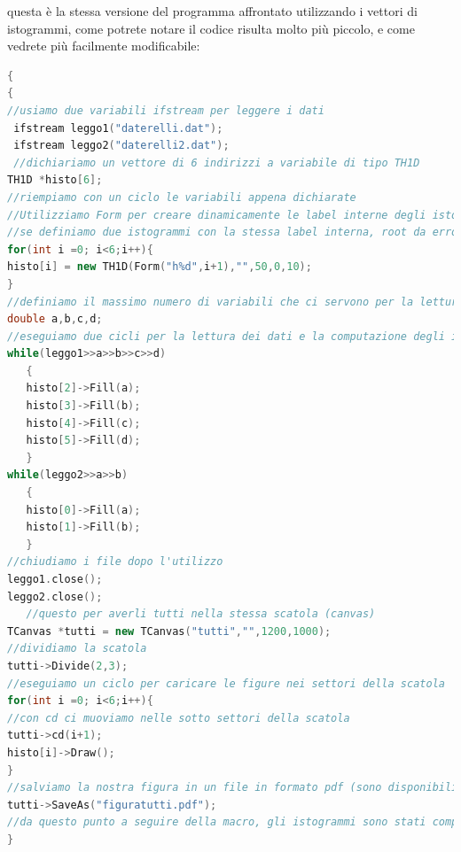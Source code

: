 \documentclass[11pt,fleqn]{book} %
\begin{document}
questa è la stessa versione del programma affrontato utilizzando i vettori di istogrammi, come potrete notare il codice risulta molto più piccolo, e come vedrete più facilmente modificabile:

\begin{lstlisting}[language=c++]
{
{
//usiamo due variabili ifstream per leggere i dati
 ifstream leggo1("daterelli.dat");
 ifstream leggo2("daterelli2.dat");
 //dichiariamo un vettore di 6 indirizzi a variabile di tipo TH1D
TH1D *histo[6];
//riempiamo con un ciclo le variabili appena dichiarate
//Utilizziamo Form per creare dinamicamente le label interne degli istogrammi
//se definiamo due istogrammi con la stessa label interna, root da errore!!!
for(int i =0; i<6;i++){
histo[i] = new TH1D(Form("h%d",i+1),"",50,0,10);
}
//definiamo il massimo numero di variabili che ci servono per la lettura
double a,b,c,d;
//eseguiamo due cicli per la lettura dei dati e la computazione degli istogrammi
while(leggo1>>a>>b>>c>>d)
   {
   histo[2]->Fill(a);
   histo[3]->Fill(b);
   histo[4]->Fill(c);
   histo[5]->Fill(d);
   }
while(leggo2>>a>>b)
   {
   histo[0]->Fill(a);
   histo[1]->Fill(b);
   }
//chiudiamo i file dopo l'utilizzo
leggo1.close();
leggo2.close();
   //questo per averli tutti nella stessa scatola (canvas)
TCanvas *tutti = new TCanvas("tutti","",1200,1000);
//dividiamo la scatola
tutti->Divide(2,3);
//eseguiamo un ciclo per caricare le figure nei settori della scatola
for(int i =0; i<6;i++){
//con cd ci muoviamo nelle sotto settori della scatola
tutti->cd(i+1);
histo[i]->Draw();
}
//salviamo la nostra figura in un file in formato pdf (sono disponibili svariati formati: jpg, png, esp, ps etc)
tutti->SaveAs("figuratutti.pdf");
//da questo punto a seguire della macro, gli istogrammi sono stati computati e quindi sono disponibili per le nostre analisi
}
\end{lstlisting}
\end{document}
